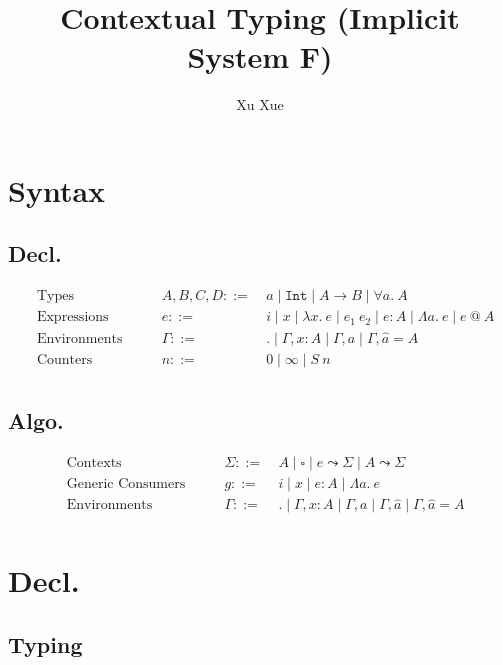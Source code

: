 \documentclass{article}
\title{Contextual Typing (Implicit System F)}
\author{Xu Xue}
\begin{document}
\maketitle

\section{Syntax}

\subsection{Decl.}

\begin{align*}
&\text{Types} \quad\quad &A, B, C, D ::=&~ a \mid \mathtt{Int} \mid A \rightarrow B \mid \forall a.~A\\
&\text{Expressions} \quad \quad &e::=&~ i \mid x \mid \lambda x . ~e \mid e_1~e_2 \mid e : A \mid \Lambda a.~e \mid e ~@~ A\\
&\text{Environments} \quad\quad &\Gamma::=&~ . \mid \Gamma, x : A \mid \Gamma, a \mid \Gamma, \hat{a} = A\\
&\text{Counters} \quad\quad &n ::=&~ 0 \mid \infty \mid S~n\\
\end{align*}

\subsection{Algo.}

\begin{align*}
    &\text{Contexts} \quad\quad &\Sigma ::=&~ A \mid \square \mid \boxed{e} \leadsto \Sigma \mid \boxed{A} \leadsto \Sigma\\
    &\text{Generic Consumers} \quad \quad &g::=&~ i \mid x \mid e : A \mid \Lambda a.~e\\
    &\text{Environments} \quad\quad &\Gamma ::=&~ . \mid \Gamma, x : A \mid \Gamma, a \mid \Gamma, \hat{a} \mid \Gamma, \hat{a}= A\\
\end{align*}


\section{Decl.}

\subsection{Typing}
\end{document}
